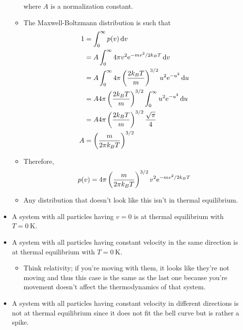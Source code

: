 \documentclass[../notes.tex]{subfiles}
\begin{document}
\begin{itemize}
\begin{itemize}
        where $A$ is a normalization constant.
        \item The Maxwell-Boltzmann distribution is such that
        \begingroup
        \allowdisplaybreaks
        \begin{align*}
            1 &= \int_0^\infty p(v)\dd{v}\\
            &= A\int_0^\infty 4\pi v^2\e[-mv^2/2k_BT]\dd{v}\\
            &= A\int_0^\infty 4\pi\left( \frac{2k_BT}{m} \right)^{3/2}u^2\e[-u^2]\dd{u}\\
            &= A4\pi\left( \frac{2k_BT}{m} \right)^{3/2}\int_0^\infty u^2\e[-u^2]\dd{u}\\
            &= A4\pi\left( \frac{2k_BT}{m} \right)^{3/2}\frac{\sqrt{\pi}}{4}\\
            A &= \left( \frac{m}{2\pi k_BT} \right)^{3/2}
        \end{align*}
        \endgroup
        \item Therefore,
        \begin{equation*}
            p(v) = 4\pi\left( \frac{m}{2\pi k_BT} \right)^{3/2}v^2\e[-mv^2/2k_BT]
        \end{equation*}
        \item Any distribution that doesn't look like this isn't in thermal equilibrium.
    \end{itemize}
    \item A system with all particles having $v=0$ is at thermal equilibrium with $T=\SI{0}{\kelvin}$.
    \item A system with all particles having constant velocity in the same direction is at thermal equilibrium with $T=\SI{0}{\kelvin}$.
    \begin{itemize}
        \item Think relativity; if you're moving with them, it looks like they're not moving and thus this case is the same as the last one because you're movement doesn't affect the thermodynamics of that system.
    \end{itemize}
    \item A system with all particles having constant velocity in different directions is not at thermal equilibrium since it does not fit the bell curve but is rather a spike.
\end{itemize}
\end{document}
